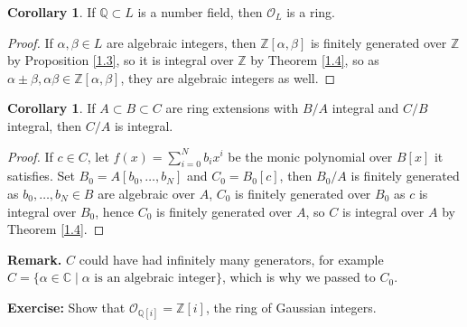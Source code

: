 \documentclass{article}
\theoremstyle{definition}
\newtheorem{cor}[theorem]{Corollary}
\begin{document}
\begin{cor}
    If $\mathbb{Q} \subset L$ is a number field, then $\mathcal{O}_L$ is a ring.
\end{cor}
\begin{proof}
    If $\alpha,\beta \in L$ are algebraic integers, then $\mathbb{Z}[\alpha,\beta]$ is finitely generated over $\mathbb{Z}$ by Proposition \ref{1.3}, so it is integral over $\mathbb{Z}$ by Theorem \ref{1.4}, so as $\alpha \pm \beta, \alpha \beta \in \mathbb{Z}[\alpha,\beta]$, they are algebraic integers as well.
\end{proof}
\begin{cor}
    If $A \subset B \subset C$ are ring extensions with $B/A$ integral and $C/B$ integral, then $C/A$ is integral.
\end{cor}
\begin{proof}
    If $c \in C$, let $f(x)=\sum_{i=0}^{N} b_i x^i$ be the monic polynomial over $B[x]$ it satisfies. Set $B_0 = A[b_0,\ldots,b_{N}]$ and $C_0=B_0[c]$, then $B_0/A$ is finitely generated as $b_0,\ldots,b_N \in B$ are algebraic over $A$, $C_0$ is finitely generated over $B_0$ as $c$ is integral over $B_0$, hence $C_0$ is finitely generated over $A$, so $C$ is integral over $A$ by Theorem \ref{1.4}.
\end{proof}
\textbf{Remark.} $C$ could have had infinitely many generators, for example $C = \{\alpha \in \mathbb{C} \mid \alpha \text{ is an algebraic integer}\}$, which is why we passed to $C_0$.
\vspace{1mm}

\textbf{Exercise:} Show that $\mathcal{O}_{\mathbb{Q}[i]}=\mathbb{Z}[i]$, the ring of Gaussian integers.
\vspace{1mm}
\end{document}
